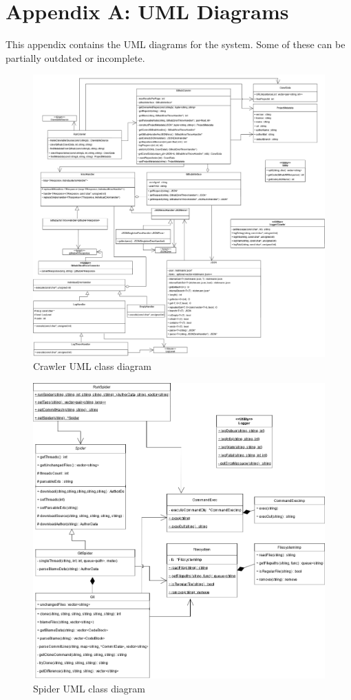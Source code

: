 \documentclass{article}
\begin{document}
\clearpage
\section*{Appendix A: UML Diagrams}
This appendix contains the UML diagrams for the system. Some of these can be partially outdated or incomplete.
\begin{figure}[h]
    \centering
    \includegraphics[width = \linewidth]{CrawlerUML.png}
    \caption{Crawler UML class diagram}
    \label{fig:umlcrawler}
\end{figure}

\begin{figure}
    \centering
    \includegraphics[width = \linewidth]{SpiderUML.png}
    \caption{Spider UML class diagram}
    \label{fig:umlspider}
\end{figure}
\end{document}
